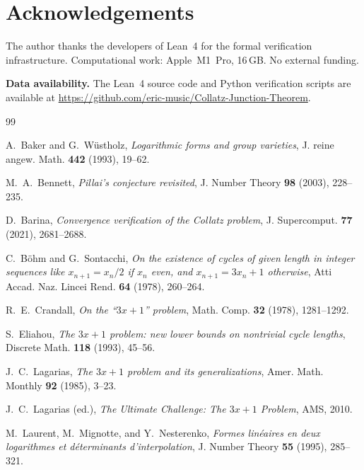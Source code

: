 \documentclass[11pt, a4paper]{amsart}
\theoremstyle{plain}
\theoremstyle{definition}
\theoremstyle{remark}
\begin{document}
\section*{Acknowledgements}

The author thanks the developers of Lean~4 for the formal
verification infrastructure.
Computational work: Apple~M1~Pro, 16\,GB.
No external funding.

\medskip\noindent\textbf{Data availability.}
The Lean~4 source code and Python verification scripts
are available at
\url{https://github.com/eric-music/Collatz-Junction-Theorem}.

\begin{thebibliography}{99}

A.~Baker and G.~W\"ustholz,
\emph{Logarithmic forms and group varieties},
J. reine angew. Math. \textbf{442} (1993), 19--62.

M.~A.~Bennett,
\emph{Pillai's conjecture revisited},
J. Number Theory \textbf{98} (2003), 228--235.

D.~Barina,
\emph{Convergence verification of the Collatz problem},
J. Supercomput. \textbf{77} (2021), 2681--2688.

C.~B\"ohm and G.~Sontacchi,
\emph{On the existence of cycles of given length in integer
sequences like $x_{n+1} = x_n/2$ if $x_n$ even, and
$x_{n+1} = 3x_n + 1$ otherwise},
Atti Accad. Naz. Lincei Rend. \textbf{64} (1978), 260--264.

R.~E.~Crandall,
\emph{On the ``$3x + 1$'' problem},
Math. Comp. \textbf{32} (1978), 1281--1292.

S.~Eliahou,
\emph{The $3x + 1$ problem: new lower bounds on nontrivial
cycle lengths},
Discrete Math. \textbf{118} (1993), 45--56.

J.~C.~Lagarias,
\emph{The $3x + 1$ problem and its generalizations},
Amer. Math. Monthly \textbf{92} (1985), 3--23.

J.~C.~Lagarias (ed.),
\emph{The Ultimate Challenge: The $3x + 1$ Problem},
AMS, 2010.

M.~Laurent, M.~Mignotte, and Y.~Nesterenko,
\emph{Formes lin\'eaires en deux logarithmes et d\'eterminants
d'interpolation},
J. Number Theory \textbf{55} (1995), 285--321.


\end{thebibliography}
\end{document}
